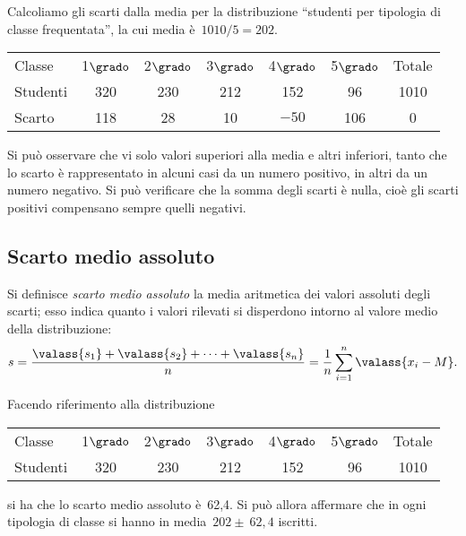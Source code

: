 \begin{esempio}
Calcoliamo gli scarti dalla media per la distribuzione ``studenti per 
tipologia di classe frequentata'', la cui media è~\(1010/5 = 202\).
\begin{center}
\begin{tabular}{l*{6}{c}}
\toprule
Classe & 1\(\grado\) & 2\(\grado\) & 3\(\grado\) & 4\(\grado\) & 5\(\grado\) 
& 
Totale\\
Studenti & 320& 230& 212& 152& 96& 1010 \\
Scarto & 118 & 28 & 10 & \(-50\) & 106 & 0\\
\bottomrule
\end{tabular}
\end{center}
Si può osservare che vi solo valori superiori alla media e altri inferiori, 
tanto che lo scarto è rappresentato in
alcuni casi da un numero positivo, in altri da un numero negativo. Si può 
verificare che la somma degli scarti è nulla,
cioè gli scarti positivi compensano sempre quelli negativi.
 \end{esempio}

\subsection{Scarto medio assoluto}
\label{subsec:stat02_scarto_assoluto}

\begin{definizione}
Si definisce \emph{scarto medio assoluto} la media aritmetica dei valori 
assoluti degli scarti; esso indica quanto i valori rilevati si disperdono
intorno al valore medio della distribuzione:
\[s=\frac{\valass{s_1}+\valass{s_2}+ \cdots +\valass{s_n}}{n}=\frac 
{1}{n}\sum_{i=1}^n \valass{x_i - M}.\]
\end{definizione}

Facendo riferimento alla distribuzione
\begin{center}
\begin{tabular}{lcccccc}
\toprule
 Classe & 1\(\grado\) & 2\(\grado\) & 3\(\grado\) & 4\(\grado\) & 5\(\grado\) & 
Totale\\
 Studenti & 320 & 230 & 212 & 152 & 96 & 1010 \\
\bottomrule
\end{tabular}
\end{center}
si ha che lo scarto medio assoluto è~62,4. Si può allora affermare che in 
ogni tipologia di classe si hanno in media~\(202\pm~62,4\) iscritti.

